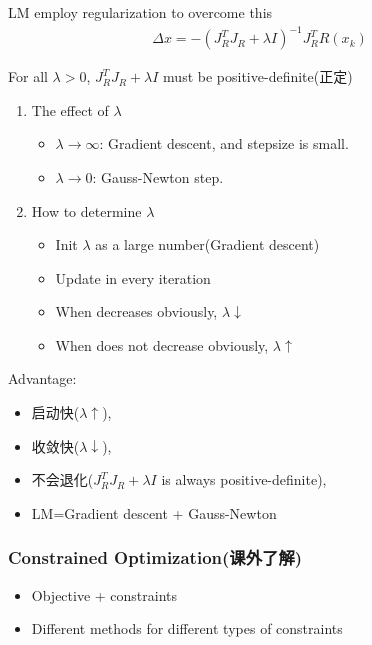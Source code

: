     LM employ regularization to overcome this
    \begin{align*}
        \Delta x=-(J_R^T J_R+\lambda I)^{-1}J_R^T R(x_k)
    \end{align*}

    For all $\lambda >0$, $J_R^T J_R+\lambda I$ must be positive-definite(正定)
    \begin{enumerate}
        \item The effect of $\lambda$
        \begin{itemize}
            \item $\lambda \rightarrow \infty$: Gradient descent, and stepsize is small.
            \item $\lambda \rightarrow 0$: Gauss-Newton step.
        \end{itemize}
        \item How to determine $\lambda$
        \begin{itemize}
            \item Init $\lambda$ as a large number(Gradient descent)
            \item Update in every iteration
            \item When decreases obviously, $\lambda \downarrow$
            \item When does not decrease obviously, $\lambda \uparrow$
        \end{itemize}
        
    \end{enumerate}

    Advantage:
    \begin{itemize}
        \item  启动快($\lambda \uparrow$), 
        \item 收敛快($\lambda \downarrow$), 
        \item 不会退化($J_R^T J_R+\lambda I$ is always positive-definite), 
        \item LM=Gradient descent + Gauss-Newton
    \end{itemize}

    \subsubsection{Constrained Optimization(课外了解)}

    \begin{itemize}
        \item Objective + constraints
        \item Different methods for different types of constraints
    \end{itemize}

